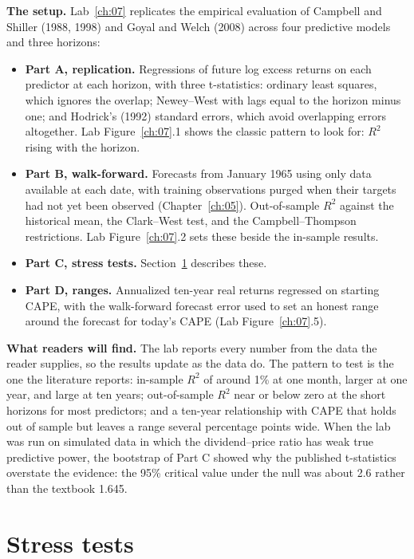 \textbf{The setup.} Lab~\ref{ch:07} replicates the empirical evaluation of Campbell and Shiller (1988, 1998) and Goyal and Welch (2008) across four predictive models and three horizons:

\begin{itemize}
  \item \textbf{Part A, replication.} Regressions of future log excess returns on each predictor at each horizon, with three t-statistics: ordinary least squares, which ignores the overlap; Newey--West with lags equal to the horizon minus one; and Hodrick's (1992) standard errors, which avoid overlapping errors altogether. Lab Figure~\ref{ch:07}.1 shows the classic pattern to look for: $R^2$ rising with the horizon.
  \item \textbf{Part B, walk-forward.} Forecasts from January 1965 using only data available at each date, with training observations purged when their targets had not yet been observed (Chapter~\ref{ch:05}). Out-of-sample $R^2$ against the historical mean, the Clark--West test, and the Campbell--Thompson restrictions. Lab Figure~\ref{ch:07}.2 sets these beside the in-sample results.
  \item \textbf{Part C, stress tests.} Section~\ref{sec:07-stress} describes these.
  \item \textbf{Part D, ranges.} Annualized ten-year real returns regressed on starting CAPE, with the walk-forward forecast error used to set an honest range around the forecast for today's CAPE (Lab Figure~\ref{ch:07}.5).
\end{itemize}

\textbf{What readers will find.} The lab reports every number from the data the reader supplies, so the results update as the data do. The pattern to test is the one the literature reports: in-sample $R^2$ of around 1\% at one month, larger at one year, and large at ten years; out-of-sample $R^2$ near or below zero at the short horizons for most predictors; and a ten-year relationship with CAPE that holds out of sample but leaves a range several percentage points wide. When the lab was run on simulated data in which the dividend--price ratio has weak true predictive power, the bootstrap of Part C showed why the published t-statistics overstate the evidence: the 95\% critical value under the null was about 2.6 rather than the textbook 1.645.

\section{Stress tests}
\label{sec:07-stress}

